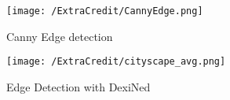 \documentclass[a4paper, 10pt]{article}
\begin{document}
\begin{multicols}{2}
		
		\begin{figure}[H]
			\centering
			\texttt{[image: /ExtraCredit/CannyEdge.png]}
			\caption{Canny Edge detection}
			\label{fig:Canny}
		\end{figure}
		
		\begin{figure}[H]
			\centering
			\texttt{[image: /ExtraCredit/cityscape\_avg.png]}
			\caption{Edge Detection with DexiNed}
			\label{fig:DexiNed}
		\end{figure}
		
		
	\end{multicols}
	
\end{document}
